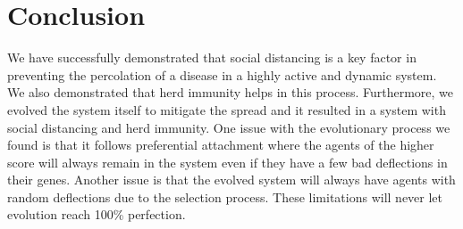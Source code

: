 \documentclass[a4paper,11pt]{article}
\begin{document}
    \section{Conclusion}
    We have successfully demonstrated that social distancing is a key factor in preventing the percolation of a disease in a highly active and dynamic system. We also demonstrated that herd immunity helps in this process. Furthermore, we evolved the system itself to mitigate the spread and it resulted in a system with social distancing and herd immunity.
    One issue with the evolutionary process we found is that it follows preferential attachment \cite{barabasi} where the agents of the higher score will always remain in the system even if they have a few bad deflections in their genes. Another issue is that the evolved system will always have agents with random deflections due to the selection process. These limitations will never let evolution reach 100\% perfection.

    \printbibliography
\end{document}

